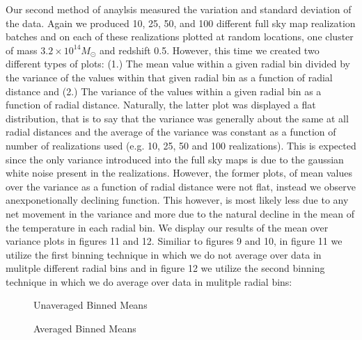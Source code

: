 \documentclass[12pt]{article} %
\begin{document}
Our second method of anaylsis measured the variation and standard deviation of the data. Again we produced 10, 25, 50, and 100 different full sky map realization batches and on each of these realizations plotted at random locations, one cluster of mass $3.2\times 10^{14} M_{\odot}$ and redshift 0.5. However, this time we created two different types of plots: (1.) The mean value within a given radial bin divided by the variance of the values within that given radial bin as a function of radial distance and (2.) The variance of the values within a given radial bin as a function of radial distance. Naturally, the latter plot was displayed a flat distribution, that is to say that the variance was generally about the same at all radial distances and the average of the variance was constant as a function of number of realizations used (e.g. 10, 25, 50 and 100 realizations). This is expected since the only variance introduced into the full sky maps is due to the gaussian white noise present in the realizations. However, the former plots, of mean values over the variance as a function of radial distance were not flat, instead we observe anexponetionally declining function. This however, is most likely less due to any net movement in the variance and more due to the natural decline in the mean of the temperature in each radial bin. We display our results of the mean over variance plots in figures 11 and 12. Similiar to figures 9 and 10, in figure 11 we utilize the first binning technique in which we do not average over data in mulitple different radial bins and in figure 12 we utilize the second binning technique in which we do average over data in mulitple radial bins:

\begin{figure}[!ht]
    \hfill
    \hfill
    \hfill
    \caption{Unaveraged Binned Means}
    \label{}
  \end{figure}

\begin{figure}[!ht]
    \hfill
    \caption{Averaged Binned Means}
    \label{}
  \end{figure}
\end{document}

